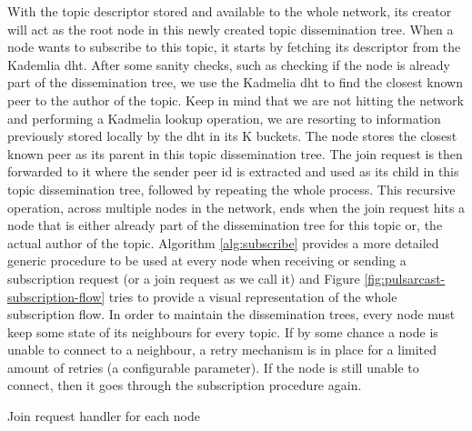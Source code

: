 With the topic descriptor stored and available to the whole network, its
creator will act as the root node in this newly created topic dissemination
tree. When a node wants to subscribe to this topic, it starts by fetching its
descriptor from the Kademlia \acrshort{dht}. After some sanity checks, such as
checking if the node is already part of the dissemination tree, we use the
Kadmelia \acrshort{dht} to find the closest known peer to the author of the
topic. Keep in mind that we are not hitting the network and performing a
Kadmelia lookup operation, we are resorting to information previously stored
locally by the \acrshort{dht} in its K buckets.  The node stores the closest
known peer as its parent in this topic dissemination tree. The join request is
then forwarded to it where the sender peer \acrshort{id} is extracted and used
as its child in this topic dissemination tree, followed by repeating the whole
process. This recursive operation, across multiple nodes in the network, ends
when the join request hits a node that is either already part of the
dissemination tree for this topic or, the actual author of the topic. Algorithm
\ref{alg:subscribe} provides a more detailed generic procedure to be used at
every node when receiving or sending a subscription request (or a join request
as we call it) and Figure \ref{fig:pulsarcast-subscription-flow} tries to
provide a visual representation of the whole subscription flow. In order to
maintain the dissemination trees, every node must keep some state of its
neighbours for every topic. If by some chance a node is unable to connect to a
neighbour, a retry mechanism is in place for a limited amount of retries (a
configurable parameter). If the node is still unable to connect, then it goes
through the subscription procedure again.

\vspace{8pt}
\begin{algorithm}[H]
  \SetAlgoLined
  \caption{Join request handler for each node}
    \label{alg:subscribe}
\end{algorithm}
\vspace{8pt}

